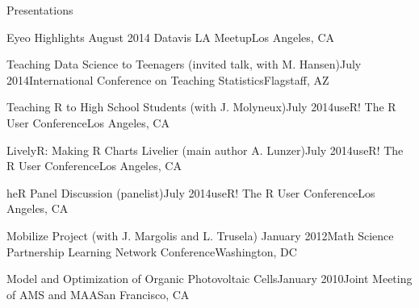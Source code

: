 \documentclass{resume} %
\begin{document}
\clearpage
\begin{rSection}{Presentations}
\begin{sSubsection}{Eyeo Highlights}{ }{August 2014 }{Datavis LA Meetup}{Los Angeles, CA}
\end{sSubsection}

\begin{sSubsection}{Teaching Data Science to Teenagers}{ (invited talk, with M. Hansen)}{July 2014}{International Conference on Teaching Statistics}{Flagstaff, AZ}
\end{sSubsection}

\begin{sSubsection}{Teaching R to High School Students}{ (with J. Molyneux)}{July 2014}{useR! The R User Conference}{Los Angeles, CA}
\end{sSubsection}

\begin{sSubsection}{LivelyR: Making R Charts Livelier}{ (main author A. Lunzer)}{July 2014}{useR! The R User Conference}{Los Angeles, CA}
\end{sSubsection}

\begin{sSubsection}{heR Panel Discussion}{ (panelist)}{July 2014}{useR! The R User Conference}{Los Angeles, CA}
\end{sSubsection}

\begin{sSubsection}{Mobilize Project}{ (with J. Margolis and L. Trusela)} {January 2012}{Math Science Partnership Learning Network Conference}{Washington, DC}
\end{sSubsection}

\begin{sSubsection}{Model and Optimization of Organic Photovoltaic Cells}{}{January 2010}{Joint Meeting of AMS and MAA}{San Francisco, CA}
\end{sSubsection}
\end{rSection}
\end{document}
